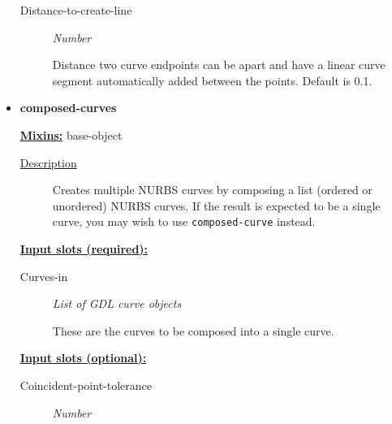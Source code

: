 \documentclass [11pt]{book}
\begin{document}
\begin{itemize}
\begin{description}
\item [Distance-to-create-line]
\emph{Number}

 Distance two curve endpoints can be apart and have a linear curve segment automatically added between the points. Default is 0.1.




\end{description}







\item {}
\label{prim:composed-curves}
\textbf{composed-curves}


\textbf{
\underline{Mixins:}} base-object





\begin{description}

\item [
\underline{Description}]


Creates multiple NURBS curves by composing a list (ordered or unordered) NURBS curves. 
If the result is expected to be a single curve, you may wish to use \texttt{composed-curve} instead.



\end{description}








\textbf{
\underline{Input slots (required):}}

\begin{description}

\item [Curves-in]
\emph{List of GDL curve objects}

 These are the curves to be composed into a single curve.




\end{description}






\textbf{
\underline{Input slots (optional):}}

\begin{description}

\item [Coincident-point-tolerance]
\emph{Number}


\end{description}
\end{itemize}
\end{document}

